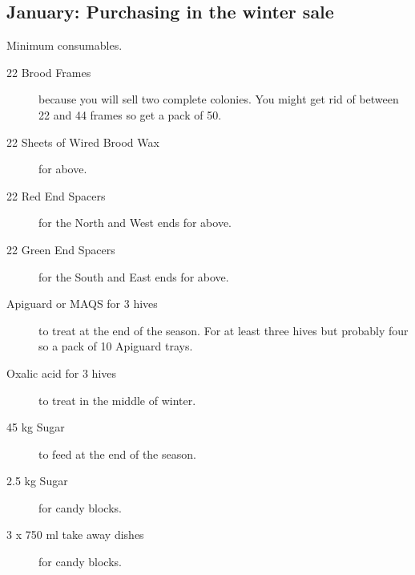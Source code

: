 \subsection{January: Purchasing in the winter sale}

Minimum consumables.

\begin{description}
    \item[22 Brood Frames] because you will sell two complete colonies.
      You might get rid of between 22 and 44 frames so get a pack of 50.
    \item[22 Sheets of Wired Brood Wax] for above.
    \item[22 Red End Spacers] for the North and West ends for above.
    \item[22 Green End Spacers] for the South and East ends for above.
    \item[Apiguard or MAQS for 3 hives] to treat at the end of the season.
      For at least three hives but probably four so a pack of 10 Apiguard trays.
    \item[Oxalic acid for 3 hives] to treat in the middle of winter.
    \item[45 kg Sugar] to feed at the end of the season.
    \item[2.5 kg Sugar] for candy blocks.
    \item[3 x 750 ml take away dishes] for candy blocks.
\end{description}

